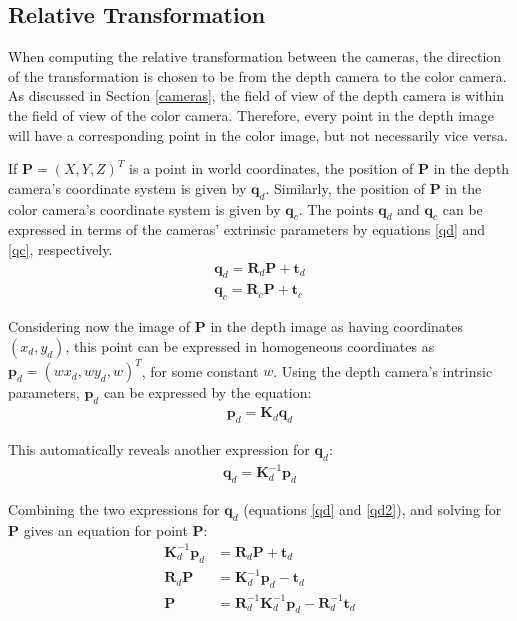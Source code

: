 \subsection{Relative Transformation} \label{relativetransformation}


When computing the relative transformation between the cameras, the direction of the transformation is 
chosen to be from the depth camera to the color camera. As discussed in Section \ref{cameras}, the field
of view of the depth camera is within the field of view of the color camera. Therefore, every point in the depth
image will have a corresponding point in the color image, but not necessarily vice versa.

If $\mathbf{P} = (X, Y, Z)^T$ is a point in world coordinates, the position of $\mathbf{P}$ in the depth 
camera's coordinate system is given by $\mathbf{q}_d$. Similarly, the position of $\mathbf{P}$ in the color 
camera's coordinate system is given by $\mathbf{q}_c$. The points $\mathbf{q}_d$ and $\mathbf{q}_c$ 
can be expressed in terms of the cameras' extrinsic parameters by equations \eqref{qd} and \eqref{qc}, 
respectively.
\begin{align}
\mathbf{q}_d = \mathbf{R}_d \mathbf{P} + \mathbf{t}_d	\label{qd} \\
\mathbf{q}_c = \mathbf{R}_c \mathbf{P} + \mathbf{t}_c  	\label{qc}
\end{align}

Considering now the image of $\mathbf{P}$ in the depth image as having coordinates $(x_d, y_d)$, this
point can be expressed in homogeneous coordinates as $\mathbf{p}_d = (w x_d, w y_d, w )^T$, for some 
constant $w$. Using the depth camera's intrinsic parameters, $\mathbf{p}_d$ can be expressed by the 
equation:
\begin{align}
	\mathbf{p}_d = \mathbf{K}_d \mathbf{q}_d \label{pd}
\end{align}

This automatically reveals another expression for $\mathbf{q}_d$:
\begin{align}
	\mathbf{q}_d  = \mathbf{K}_{d}^{-1} \mathbf{p}_d \label{qd2}
\end{align}

Combining the two expressions for $\mathbf{q}_d$ (equations \eqref{qd} and \eqref{qd2}), and solving for 
$\mathbf{P}$ gives an equation for point $\mathbf{P}$:
\begin{align}
	\mathbf{K}_{d}^{-1} \mathbf{p}_d &= \mathbf{R}_d \mathbf{P} + \mathbf{t}_d \nonumber \\
	\mathbf{R}_d \mathbf{P} &= \mathbf{K}_{d}^{-1} \mathbf{p}_d - \mathbf{t}_d  \nonumber \\
	\mathbf{P} &= \mathbf{R}_{d}^{-1} \mathbf{K}_{d}^{-1} \mathbf{p}_d - \mathbf{R}_{d}^{-1} \mathbf{t}_d  
\end{align}

